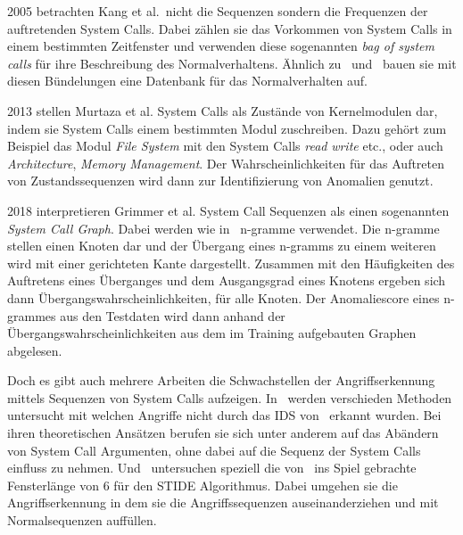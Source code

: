         2005 betrachten Kang et al.\ nicht die Sequenzen sondern die Frequenzen der auftretenden System Calls.
        Dabei zählen sie das Vorkommen von System Calls in einem bestimmten Zeitfenster und verwenden diese sogenannten \textit{bag of system calls} für ihre Beschreibung des Normalverhaltens.
        Ähnlich zu~\cite{FORREST} und~\cite{STIDE} bauen sie mit diesen Bündelungen eine Datenbank für das Normalverhalten auf.~\cite{FREQUENCY2}

        2013 stellen Murtaza et al. System Calls als Zustände von Kernelmodulen dar, indem sie System Calls einem bestimmten Modul zuschreiben.
        Dazu gehört zum Beispiel das Modul \textit{File System} mit den System Calls \textit{read} \textit{write} etc., oder auch \textit{Architecture}, \textit{Memory Management}.
        Der Wahrscheinlichkeiten für das Auftreten von Zustandssequenzen wird dann zur Identifizierung von Anomalien genutzt.~\cite{SYSTEM_STATES}

        2018 interpretieren Grimmer et al. System Call Sequenzen als einen sogenannten \textit{System Call Graph}.
        Dabei werden wie in~\cite{STIDE_Alternatives} n-gramme verwendet.
        Die n-gramme stellen einen Knoten dar und der Übergang eines n-gramms zu einem weiteren wird mit einer gerichteten Kante dargestellt.
        Zusammen mit den Häufigkeiten des Auftretens eines Überganges und dem Ausgangsgrad eines Knotens ergeben sich dann Übergangswahrscheinlichkeiten, für alle Knoten.
        Der Anomaliescore eines n-grammes aus den Testdaten wird dann anhand der Übergangswahrscheinlichkeiten aus dem im Training aufgebauten Graphen abgelesen.~\cite{SYSCALL_GRAPHS} 


    Doch es gibt auch mehrere Arbeiten die Schwachstellen der Angriffserkennung mittels Sequenzen von System Calls aufzeigen.
    In~\cite{Syscallseqexploit1} werden verschieden Methoden untersucht mit welchen Angriffe nicht durch das IDS von~\cite{FORREST2000} erkannt wurden.
    Bei ihren theoretischen Ansätzen berufen sie sich unter anderem auf das Abändern von System Call Argumenten, ohne dabei auf die Sequenz der System Calls einfluss zu nehmen.
    Und~\cite{Syscallseqexploit3} untersuchen speziell die von~\cite{FORREST} ins Spiel gebrachte Fensterlänge von $6$ für den \ac{STIDE} Algorithmus.
    Dabei umgehen sie die Angriffserkennung in dem sie die Angriffssequenzen auseinanderziehen und mit Normalsequenzen auffüllen.



